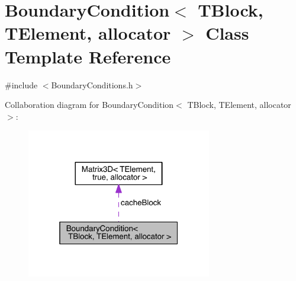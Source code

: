 \hypertarget{class_boundary_condition}{}\section{Boundary\+Condition$<$ T\+Block, T\+Element, allocator $>$ Class Template Reference}
\label{class_boundary_condition}


{\ttfamily \#include $<$Boundary\+Conditions.\+h$>$}



Collaboration diagram for Boundary\+Condition$<$ T\+Block, T\+Element, allocator $>$\+:\nopagebreak
\begin{figure}[H]
\begin{center}
\leavevmode
\includegraphics[width=229pt]{d7/d21/class_boundary_condition__coll__graph}
\end{center}
\end{figure}
